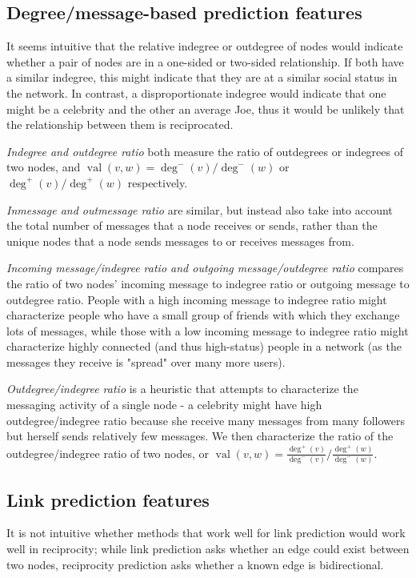 \documentclass[conference]{IEEEtran}
\begin{document}
\subsection{Degree/message-based prediction features}
It seems intuitive that the relative indegree or outdegree of nodes would indicate whether a pair of nodes are in a one-sided or two-sided relationship. If both have a similar indegree, this might indicate that they are at a similar social status in the network. In contrast, a disproportionate indegree would indicate that one might be a celebrity and the other an average Joe, thus it would be unlikely that the relationship between them is reciprocated.

\emph{Indegree and outdegree ratio} both measure the ratio of outdegrees or indegrees of two nodes, and $\operatorname{val}(v,w) = \deg^-(v)/\deg^-(w)$ or $\deg^+(v)/\deg^+(w)$ respectively.

\emph{Inmessage and outmessage ratio} are similar, but instead also take into account the total number of messages that a node receives or sends, rather than the unique nodes that a node sends messages to or receives messages from.

\emph{Incoming message/indegree ratio and outgoing message/outdegree ratio} compares the ratio of two nodes' incoming message to indegree ratio or outgoing message to outdegree ratio. People with a high incoming message to indegree ratio might characterize people who have a small group of friends with which they exchange lots of messages, while those with a low incoming message to indegree ratio might characterize highly connected (and thus high-status) people in a network (as the messages they receive is "spread" over many more users).

\emph{Outdegree/indegree ratio} is a heuristic that attempts to characterize the messaging activity of a single node - a celebrity might have high outdegree/indegree ratio because she receive many messages from many followers but herself sends relatively few messages. We then characterize the ratio of the outdegree/indegree ratio of two nodes, or $\operatorname{val}(v,w) = \frac{\deg^+(v)}{\deg^-(v)} / \frac{\deg^+(w)}{\deg^-(w)}$.

\subsection{Link prediction features}
It is not intuitive whether methods that work well for link prediction would work well in reciprocity; while link prediction asks whether an edge could exist between two nodes, reciprocity prediction asks whether a known edge is bidirectional.
\end{document}
